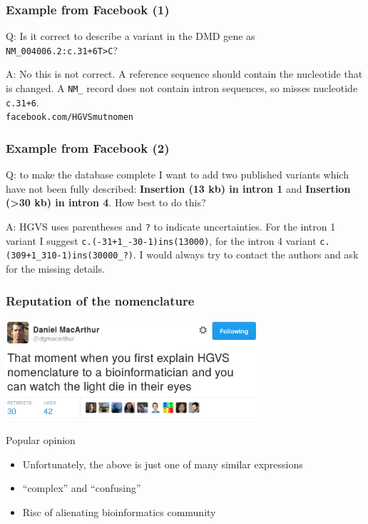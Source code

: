 \documentclass[14pt]{beamer}
\begin{document}
\begin{frame}[fragile]
  \frametitle{Example from Facebook (1)}

  \textcolor{hgvs}{Q}: Is it correct to describe a variant in the DMD gene as
  \verb|NM_004006.2:c.31+6T>C|?\\[1em]

  \pause

  \textcolor{hgvs}{A}: No this is not correct. A reference sequence should
  contain the nucleotide that is changed. A \verb|NM_| record does not contain
  intron sequences, so misses nucleotide \verb|c.31+6|.\\[2em]

  \verb|facebook.com/HGVSmutnomen|
\end{frame}


\begin{frame}[fragile]
  \frametitle{Example from Facebook (2)}

  \textcolor{hgvs}{Q}: to make the database complete I want to add two
  published variants which have not been fully described: \textbf{Insertion
    (13 kb) in intron 1} and \textbf{Insertion (>30 kb) in intron 4}. How
  best to do this?\\[1em]

  \pause

  \textcolor{hgvs}{A}: HGVS uses parentheses and \verb|?| to indicate
  uncertainties. For the intron 1 variant I suggest
  \verb|c.(-31+1_-30-1)ins(13000)|, for the intron 4 variant
  \verb|c.(309+1_310-1)ins(30000_?)|. I would always try to contact the
  authors and ask for the missing details.
\end{frame}


\begin{frame}
  \frametitle{Reputation of the nomenclature}
  \begin{center}
    \includegraphics[width=0.7\textwidth]{pictures/twitter.png}
  \end{center}
  \pause
  \begin{block}{Popular opinion}
    \begin{itemize}
      \item Unfortunately, the above is just one of many similar expressions
      \item ``complex'' and ``confusing''
      \item Risc of alienating bioinformatics community
    \end{itemize}
  \end{block}
\end{frame}
\end{document}
